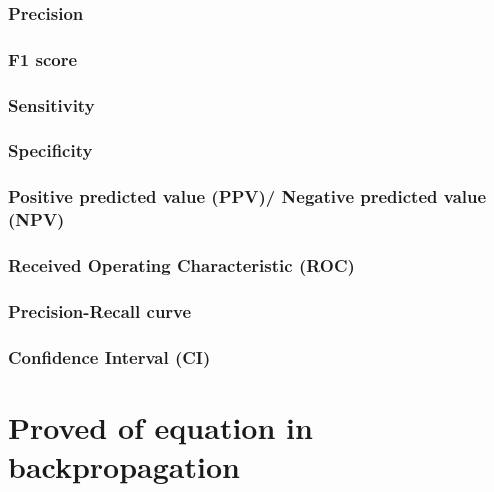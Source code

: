\subsubsection{Precision}
\subsubsection{F1 score}

\subsubsection{Sensitivity}

\subsubsection{Specificity}

\subsubsection{Positive predicted value (PPV)/ Negative predicted value (NPV)}

\subsubsection{Received Operating Characteristic (ROC)}

\subsubsection{Precision-Recall curve}

\subsubsection{Confidence Interval (CI)}

\section{Proved of equation in backpropagation}